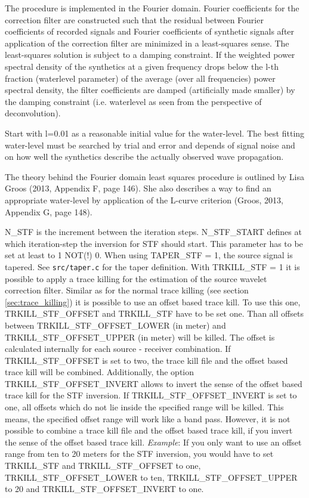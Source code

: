 The procedure is implemented in the Fourier domain. Fourier coefficients for the correction filter are constructed such that the residual between Fourier coefficients of recorded signals and Fourier coefficients of synthetic signals after application of the correction filter are minimized in a least-squares sense. The least-squares solution is subject to a damping constraint. If the weighted power spectral density of the synthetics at a given frequency drops below the l-th fraction (waterlevel parameter) of the average (over all frequencies) power spectral density, the filter coefficients are damped (artificially made smaller) by the damping constraint (i.e. waterlevel as seen from the perspective of deconvolution). 

Start with l=0.01 as a reasonable initial value for the water-level. The best fitting water-level must be searched by trial and error and depends of signal noise and on how well the synthetics describe the actually observed wave propagation.

The theory behind the Fourier domain least squares procedure is outlined by Lisa Groos (2013, Appendix F, page 146). She also describes a way to find an appropriate water-level by application of the L-curve criterion (Groos, 2013, Appendix G, page 148).
\newline

N\_STF is the increment between the iteration steps. N\_STF\_START defines at which iteration-step the inversion for STF should start. This parameter has to be set at least to 1 NOT(!) 0. When using TAPER\_STF = 1, the source signal is tapered. See \texttt{src/taper.c} for the taper definition. With TRKILL\_STF = 1 it is possible to apply a trace killing for the estimation of the source wavelet correction filter. Similar as for the normal trace killing (see section \ref{sec:trace_killing}) it is possible to use an offset based trace kill. To use this one, TRKILL\_STF\_OFFSET and TRKILL\_STF have to be set one. Than all offsets between TRKILL\_STF\_OFFSET\_LOWER (in meter) and TRKILL\_STF\_OFFSET\_UPPER (in meter) will be killed. The offset is calculated internally for each source - receiver combination. If TRKILL\_STF\_OFFSET is set to two, the trace kill file and the offset based trace kill will be combined. Additionally, the option TRKILL\_STF\_OFFSET\_INVERT allows to invert the sense of the offset based trace kill for the STF inversion. If TRKILL\_STF\_OFFSET\_INVERT is set to one, all offsets which do not lie inside the specified range will be killed. This means, the specified offset range will work like a band pass. However, it is not possible to combine a trace kill file and the offset based trace kill, if you invert the sense of the offset based trace kill. \textit{Example}: If you only want to use an offset range from ten to 20 meters for the STF inversion, you would have to set TRKILL\_STF and TRKILL\_STF\_OFFSET to one, TRKILL\_STF\_OFFSET\_LOWER to ten, TRKILL\_STF\_OFFSET\_UPPER to 20 and TRKILL\_STF\_OFFSET\_INVERT to one.
\newline


